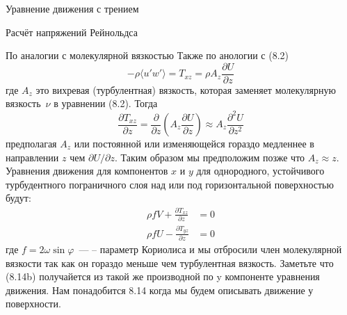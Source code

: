 \begin{chapter}{Уравнение движения с трением}
\begin{section}{Расчёт напряжений Рейнольдса}
\begin{paragraph}{По аналогии с молекулярной вязкостью}
Также по анологии с (8.2)
\begin{equation}
- \rho \langle u'w'\rangle = T_{xz} = \rho A_z \frac{\partial U}{\partial z}
\end{equation}
где $A_z$ это вихревая (турбулентная) вязкость, которая заменяет
молекулярную вязкость~$\nu$ в уравнении (8.2). Тогда
\begin{equation} 
\frac{\partial{T_{xz}}}{\partial{z}} =
\frac{\partial}{\partial{z}}\left(A_z\frac{\partial{U}}{\partial{z}}\right)
\approx A_z \frac{\partial^2 U}{\partial z^2}
\end{equation}
предполагая $A_z$ или постоянной или изменяющейся гораздо медленнее в
направлении $z$ чем $\partial U / \partial z$. Таким образом мы
предположим позже что $A_z \approx z$.  Уравнения движения для
компонентов $x$ и $y$ для однородного, устойчивого турбудентного
пограничного слоя над или под горизонтальной поверхностью будут:
\begin{subequations}
\begin{align}
\rho fV + \frac{\partial {T_{xz}}}{\partial z} & = 0 \\
\rho fU - \frac{\partial {T_{yz}}}{\partial z} & = 0
\end{align}
\end{subequations}
где $f=2\omega \sin \varphi$~--- – параметр Кориолиса и мы
отбросили член молекулярной вязкости так как он гораздо меньше чем
турбулентная вязкость. Заметьте что (8.14b) получайется из такой же
производной по y компоненте уравнения движения. Нам понадобится 8.14
когда мы будем описывать движение у поверхности.
%
% 

\end{paragraph}
\end{section}
\end{chapter}
